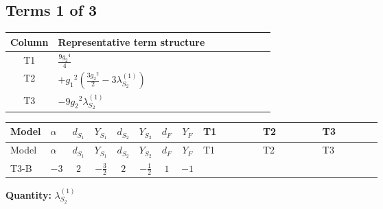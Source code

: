 \documentclass[8pt]{article}
\begin{document}
\begin{landscape}
\subsection*{Terms 1 of 3}
\begin{center}
\begin{tabular}{@{}c >{\raggedright\arraybackslash}p{0.82\linewidth}@{}}
\toprule
Column & Representative term structure \\
\midrule
T1 & \(\displaystyle \frac{9 {g_2}^4}{4}\) \\
\midrule
T2 & \(\displaystyle +{g_1}^2 \left(\frac{3 {g_2}^2}{2}-3 {\lambda_{S_2}^{(1)}}\right)\) \\
\midrule
T3 & \(\displaystyle -9 {g_2}^2 {\lambda_{S_2}^{(1)}}\) \\
\midrule
\bottomrule
\end{tabular}
\end{center}
\smallskip
\tiny
\begin{longtable}{@{}llcccccc >{\raggedright\arraybackslash}p{0.21\linewidth} >{\raggedright\arraybackslash}p{0.21\linewidth} >{\raggedright\arraybackslash}p{0.21\linewidth}@{}}
\toprule
Model & $\alpha$ & $d_{S_1}$ & $Y_{S_1}$ & $d_{S_2}$ & $Y_{S_2}$ & $d_F$ & $Y_F$ & T1 & T2 & T3 \\
\midrule
\endfirsthead
\toprule
Model & $\alpha$ & $d_{S_1}$ & $Y_{S_1}$ & $d_{S_2}$ & $Y_{S_2}$ & $d_F$ & $Y_F$ & T1 & T2 & T3 \\
\midrule
\endhead
T3-B & $-3$ & $2$ & $-\frac{3}{2}$ & $2$ & $-\frac{1}{2}$ & $1$ & $-1$ & \scriptsize\adjustbox{max width=\linewidth}{$\begin{gathered} \frac{9 {g_2}^4}{4}\end{gathered}$} & \scriptsize\adjustbox{max width=\linewidth}{$\begin{gathered} +{g_1}^2 \left(\frac{3 {g_2}^2}{2}-3 {\lambda_{S_2}^{(1)}}\right)\end{gathered}$} & \scriptsize\adjustbox{max width=\linewidth}{$\begin{gathered} -9 {g_2}^2 {\lambda_{S_2}^{(1)}}\end{gathered}$} \\
\midrule
\bottomrule
\end{longtable}
\clearpage
\noindent\textbf{Quantity: }$\lambda_{S_2}^{(1)}$\par\smallskip

\end{landscape}
\end{document}
